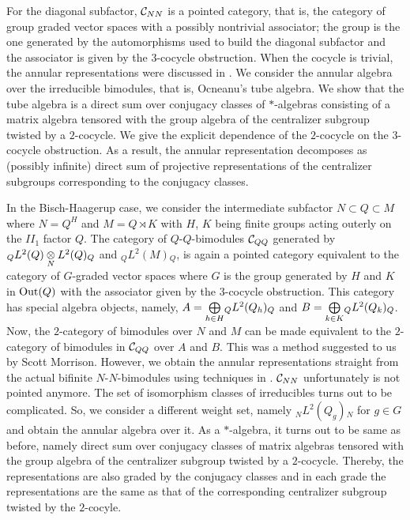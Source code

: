 For the diagonal subfactor, $ \mathcal C_{NN} $ is a pointed category, that is, the category of group graded vector spaces with a possibly nontrivial associator; the group is the one generated by the automorphisms used to build the diagonal subfactor and the associator is given by the $ 3 $-cocycle obstruction.
When the cocycle is trivial, the annular representations were discussed in \cite{GJ}.
We consider the annular algebra over the irreducible bimodules, that is, Ocneanu's tube algebra.
We show that the tube algebra is a direct sum over conjugacy classes of $ * $-algebras consisting of a matrix algebra tensored with the group algebra of the centralizer subgroup twisted by a $ 2 $-cocycle.
We give the explicit dependence of the $ 2 $-cocycle on the $ 3 $-cocycle obstruction. As a result, the annular representation decomposes as (possibly infinite) direct sum of projective representations of the centralizer subgroups corresponding to the conjugacy classes.

In the Bisch-Haagerup case, we consider the intermediate subfactor $ N \subset Q \subset M $ where $ N= Q^H $ and $ M = Q \rtimes K $ with $H$, $K$ being finite groups acting outerly on the $II_1$ factor $Q$.
The category of $ Q$-$Q $-bimodules $ \mathcal C_{QQ} $ generated by $ {}_Q L^2(Q) \underset{N}{\otimes} L^2(Q) {}_Q  $ and $ {}_Q L^2(M) {}_Q  $, is again a pointed category equivalent to the category of $ G $-graded vector spaces where $ G $ is the group generated by $ H $ and $ K $ in $ \text{Out} (Q) $ with the associator given by the $ 3 $-cocycle obstruction.
This category has special algebra objects, namely, $ A = \underset{h \in H}{\bigoplus} {}_Q L^2(Q_h) {}_Q $ and $ B = \underset{k \in K}{\bigoplus} {}_Q L^2(Q_k) {}_Q $.
Now, the $ 2 $-category of bimodules over $ N $ and $ M $ can be made equivalent to the $ 2 $-category of bimodules in $ \mathcal C_{QQ} $ over $ A $ and $ B $.
This was a method suggested to us by Scott Morrison.
However, we obtain the annular representations straight from the actual bifinite $ N$-$N $-bimodules using techniques in \cite{GJ}.
$ \mathcal C_{NN} $ unfortunately is not pointed anymore.
The set of isomorphism classes of irreducibles turns out to be complicated.
So, we consider a different weight set, namely $ {}_N L^2(Q_g) {}_N  $ for $ g\in G $ and obtain the annular algebra over it.
As a $ * $-algebra, it turns out to be same as before, namely direct sum over conjugacy classes of matrix algebras tensored with the group algebra of the centralizer subgroup twisted by a $ 2 $-cocycle. Thereby, the representations are also graded by the conjugacy classes and in each grade the representations are the same as that of the corresponding centralizer subgroup twisted by the $ 2 $-cocyle.